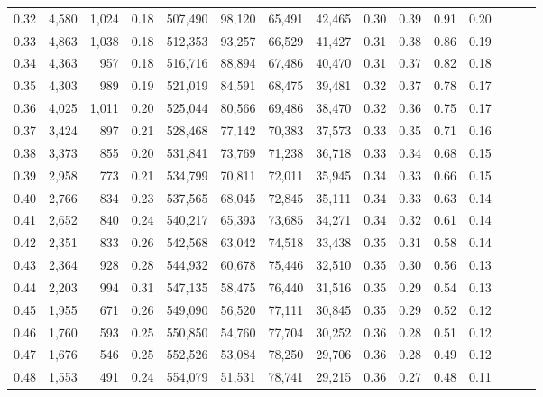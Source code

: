 \begin{tabular}{rrrrrrrrrrrrrrr}
0.32 &   4,580 &  1,024 &  0.18 &  507,490 &   98,120 &   65,491 &   42,465 &  0.30 &  0.39 &  0.91 &      0.20 \\
0.33 &   4,863 &  1,038 &  0.18 &  512,353 &   93,257 &   66,529 &   41,427 &  0.31 &  0.38 &  0.86 &      0.19 \\
0.34 &   4,363 &    957 &  0.18 &  516,716 &   88,894 &   67,486 &   40,470 &  0.31 &  0.37 &  0.82 &      0.18 \\
0.35 &   4,303 &    989 &  0.19 &  521,019 &   84,591 &   68,475 &   39,481 &  0.32 &  0.37 &  0.78 &      0.17 \\
0.36 &   4,025 &  1,011 &  0.20 &  525,044 &   80,566 &   69,486 &   38,470 &  0.32 &  0.36 &  0.75 &      0.17 \\
0.37 &   3,424 &    897 &  0.21 &  528,468 &   77,142 &   70,383 &   37,573 &  0.33 &  0.35 &  0.71 &      0.16 \\
0.38 &   3,373 &    855 &  0.20 &  531,841 &   73,769 &   71,238 &   36,718 &  0.33 &  0.34 &  0.68 &      0.15 \\
0.39 &   2,958 &    773 &  0.21 &  534,799 &   70,811 &   72,011 &   35,945 &  0.34 &  0.33 &  0.66 &      0.15 \\
0.40 &   2,766 &    834 &  0.23 &  537,565 &   68,045 &   72,845 &   35,111 &  0.34 &  0.33 &  0.63 &      0.14 \\
0.41 &   2,652 &    840 &  0.24 &  540,217 &   65,393 &   73,685 &   34,271 &  0.34 &  0.32 &  0.61 &      0.14 \\
0.42 &   2,351 &    833 &  0.26 &  542,568 &   63,042 &   74,518 &   33,438 &  0.35 &  0.31 &  0.58 &      0.14 \\
0.43 &   2,364 &    928 &  0.28 &  544,932 &   60,678 &   75,446 &   32,510 &  0.35 &  0.30 &  0.56 &      0.13 \\
0.44 &   2,203 &    994 &  0.31 &  547,135 &   58,475 &   76,440 &   31,516 &  0.35 &  0.29 &  0.54 &      0.13 \\
0.45 &   1,955 &    671 &  0.26 &  549,090 &   56,520 &   77,111 &   30,845 &  0.35 &  0.29 &  0.52 &      0.12 \\
0.46 &   1,760 &    593 &  0.25 &  550,850 &   54,760 &   77,704 &   30,252 &  0.36 &  0.28 &  0.51 &      0.12 \\
0.47 &   1,676 &    546 &  0.25 &  552,526 &   53,084 &   78,250 &   29,706 &  0.36 &  0.28 &  0.49 &      0.12 \\
0.48 &   1,553 &    491 &  0.24 &  554,079 &   51,531 &   78,741 &   29,215 &  0.36 &  0.27 &  0.48 &      0.11 \\

\end{tabular}
